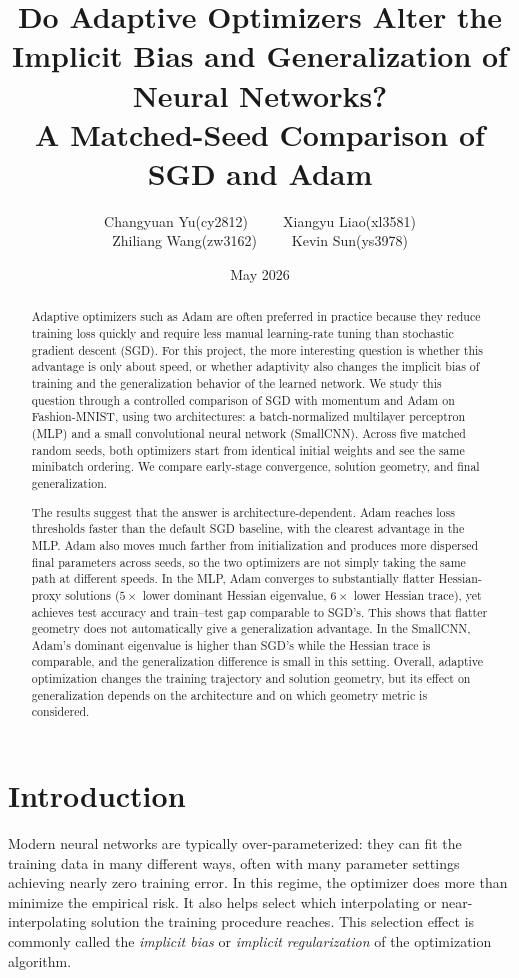 \documentclass[11pt]{article}
\title{\textbf{Do Adaptive Optimizers Alter the Implicit Bias and Generalization of Neural Networks?}\\
\Large A Matched-Seed Comparison of SGD and Adam}
\author{Changyuan Yu(cy2812)~~~~~Xiangyu Liao(xl3581)\\Zhiliang Wang(zw3162)~~~~~Kevin Sun(ys3978)}
\date{May 2026}
\begin{document}
\maketitle

\begin{abstract}
Adaptive optimizers such as Adam are often preferred in practice because they reduce training loss quickly and require less manual learning-rate tuning than stochastic gradient descent (SGD). For this project, the more interesting question is whether this advantage is only about speed, or whether adaptivity also changes the implicit bias of training and the generalization behavior of the learned network. We study this question through a controlled comparison of SGD with momentum and Adam on Fashion-MNIST, using two architectures: a batch-normalized multilayer perceptron (MLP) and a small convolutional neural network (SmallCNN). Across five matched random seeds, both optimizers start from identical initial weights and see the same minibatch ordering. We compare early-stage convergence, solution geometry, and final generalization.

The results suggest that the answer is architecture-dependent. Adam reaches loss thresholds faster than the default SGD baseline, with the clearest advantage in the MLP. Adam also moves much farther from initialization and produces more dispersed final parameters across seeds, so the two optimizers are not simply taking the same path at different speeds. In the MLP, Adam converges to substantially flatter Hessian-proxy solutions ($5\times$ lower dominant Hessian eigenvalue, $6\times$ lower Hessian trace), yet achieves test accuracy and train--test gap comparable to SGD's. This shows that flatter geometry does not automatically give a generalization advantage. In the SmallCNN, Adam's dominant eigenvalue is higher than SGD's while the Hessian trace is comparable, and the generalization difference is small in this setting. Overall, adaptive optimization changes the training trajectory and solution geometry, but its effect on generalization depends on the architecture and on which geometry metric is considered.
\end{abstract}

\section{Introduction}

Modern neural networks are typically over-parameterized: they can fit the training data in many different ways, often with many parameter settings achieving nearly zero training error. In this regime, the optimizer does more than minimize the empirical risk. It also helps select which interpolating or near-interpolating solution the training procedure reaches. This selection effect is commonly called the \emph{implicit bias} or \emph{implicit regularization} of the optimization algorithm.
\end{document}
